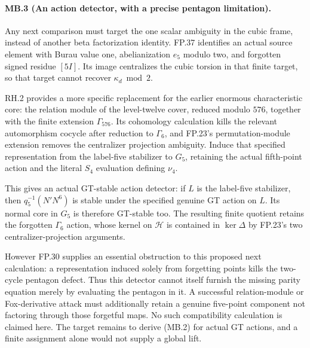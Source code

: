 \paragraph{MB.3 (An action detector, with a precise pentagon limitation).}
Any next comparison must target the one scalar ambiguity
in the cubic frame, instead of another beta factorization identity.
FP.37 identifies an actual source element with Burau value one,
abelianization $e_5$ modulo two, and forgotten signed residue
$[5I]$. Its image centralizes the cubic torsion in that finite
target, so that target cannot recover $\kappa_d\bmod2$.

RH.2 provides a more specific replacement for the earlier enormous
characteristic core: the relation module of the level-twelve
cover, reduced modulo $576$, together with the finite extension
$\Gamma_{576}$. Its cohomology calculation kills the relevant
automorphism cocycle after reduction to $\Gamma_6$, and FP.23's
permutation-module extension removes the centralizer projection
ambiguity. Induce that specified representation from the
label-five stabilizer to $G_5$, retaining the actual fifth-point
action and the literal $S_4$ evaluation defining $\nu_4$.

This gives an actual GT-stable action detector: if $L$ is the
label-five stabilizer, then $q_5^{-1}(N'N^6)$ is stable under
the specified genuine GT action on $L$. Its normal core in
$G_5$ is therefore GT-stable too. The resulting finite quotient
retains the forgotten $\Gamma_6$ action, whose kernel on
$\mathcal H$ is contained in $\ker\Delta$ by FP.23's two
centralizer-projection arguments.

However FP.30 supplies an essential obstruction to this proposed
next calculation: a representation induced solely from forgetting
points kills the two-cycle pentagon defect. Thus this detector
cannot itself furnish the missing parity equation merely by
evaluating the pentagon in it. A successful relation-module or
Fox-derivative attack must additionally retain a genuine
five-point component not factoring through those forgetful maps.
No such compatibility calculation is claimed here. The target
remains to derive (MB.2) for actual GT actions, and a finite
assignment alone would not supply a global lift.
